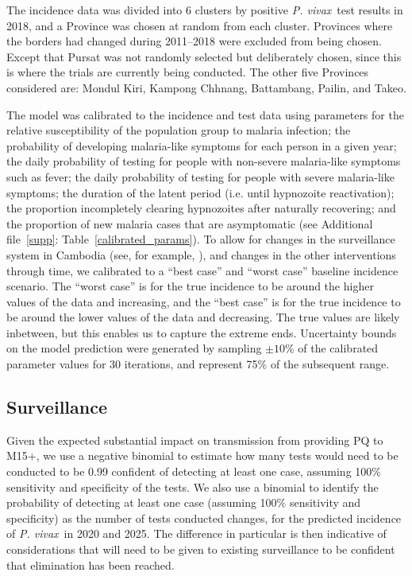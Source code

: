 \documentclass[doublespacing]{bmcart}
\newcommand{\pv}{\textit{P. vivax}}
\begin{document}
The incidence data was divided into 6 clusters by positive \pv~test results in 2018, and a Province was chosen at random from each cluster. Provinces where the borders had changed during 2011--2018 were excluded from being chosen. Except that Pursat was not randomly selected but deliberately chosen, since this is where the trials are currently being conducted. The other five Provinces considered are: Mondul Kiri, Kampong Chhnang, Battambang, Pailin, and Takeo. 

The model was calibrated to the incidence and test data using parameters for the relative susceptibility of the population group to malaria infection; the probability of developing malaria-like symptoms for each person in a given year; the daily probability of testing for people with non-severe malaria-like symptoms such as fever; the daily probability of testing for people with severe malaria-like symptoms; the duration of the latent period (i.e. until hypnozoite reactivation); the proportion incompletely clearing hypnozoites after naturally recovering; and the proportion of new malaria cases that are asymptomatic (see Additional file~\ref{supp}: Table~\ref{calibrated_params}). To allow for changes in the surveillance system in Cambodia (see, for example, \cite{Pengby}), and changes in the other interventions through time, we calibrated to a ``best case'' and ``worst case'' baseline incidence scenario. The ``worst case'' is for the true incidence to be around the higher values of the data and increasing, and the ``best case'' is for the true incidence to be around the lower values of the data and decreasing. The true values are likely inbetween, but this enables us to capture the extreme ends. Uncertainty bounds on the model prediction were generated by sampling $\pm10\%$ of the calibrated parameter values for 30 iterations, and represent 75\% of the subsequent range.

 


\subsection*{Surveillance}
Given the expected substantial impact on transmission from providing PQ to M15+, we use a negative binomial to estimate how many tests would need to be conducted to be 0.99 confident of detecting at least one case, assuming 100\% sensitivity and specificity of the tests. We also use a binomial to identify the probability of detecting at least one case (assuming 100\% sensitivity and specificity) as the number of tests conducted changes, for the predicted incidence of \pv~in 2020 and 2025. The difference in particular is then indicative of considerations that will need to be given to existing surveillance to be confident that elimination has been reached.
\end{document}
